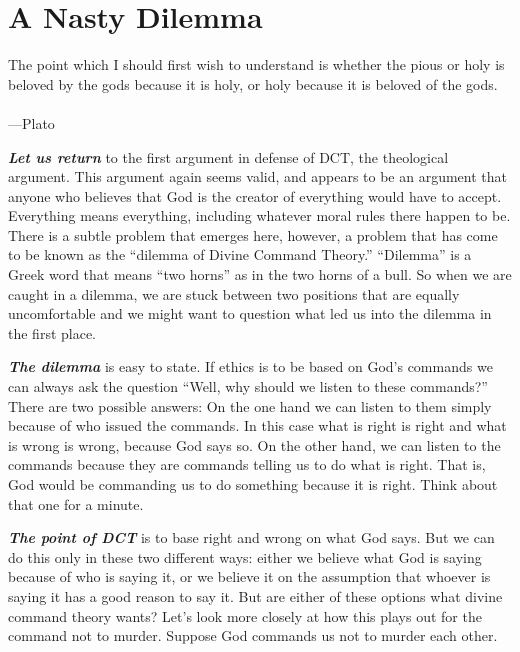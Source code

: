 \documentclass[12pt, openany]{book}
\newenvironment{epigraph}%
{
\begin{flushright}
\begin{minipage}{30em}
\begin{flushright}
\itshape
}%
{
\end{flushright}
\end{minipage}
\end{flushright}
\vspace{1em}
}
\begin{document}
\hypertarget{a-nasty-dilemma}{%
\section{A Nasty Dilemma}\label{a-nasty-dilemma}}

\begin{epigraph}

The point which I should first wish to understand is whether the pious or holy is beloved by the gods because it is holy, or holy because it is beloved of the gods.\\
~\\
---Plato

\end{epigraph}

\textbf{\emph{Let us return}} to the first argument in defense of DCT, the theological argument. This argument again seems valid, and appears to be an argument that anyone who believes that God is the creator of everything would have to accept. Everything means everything, including whatever moral rules there happen to be. There is a subtle problem that emerges here, however, a problem that has come to be known as the ``dilemma of Divine Command Theory.'' ``Dilemma'' is a Greek word that means ``two horns'' as in the two horns of a bull. So when we are caught in a dilemma, we are stuck between two positions that are equally uncomfortable and we might want to question what led us into the dilemma in the first place.

\textbf{\emph{The dilemma}} is easy to state. If ethics is to be based on God's commands we can always ask the question ``Well, why should we listen to these commands?'' There are two possible answers: On the one hand we can listen to them simply because of who issued the commands. In this case what is right is right and what is wrong is wrong, because God says so. On the other hand, we can listen to the commands because they are commands telling us to do what is right. That is, God would be commanding us to do something because it is right. Think about that one for a minute.

\textbf{\emph{The point of DCT}} is to base right and wrong on what God says. But we can do this only in these two different ways: either we believe what God is saying because of who is saying it, or we believe it on the assumption that whoever is saying it has a good reason to say it. But are either of these options what divine command theory wants? Let's look more closely at how this plays out for the command not to murder. Suppose God commands us not to murder each other.
\end{document}
